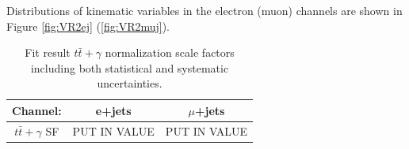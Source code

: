 Distributions of kinematic variables in the electron (muon) channels are shown in Figure \ref{fig:VR2ej} (\ref{fig:VR2muj}).
\begin{table}[h]
\begin{center}
{\renewcommand{\arraystretch}{1.2}
\begin{tabular}{c|c|c}
\hline
Channel:     &  e+jets   & $\mu$+jets  \\  \hline 
$t\bar{t}+\gamma$ SF    &  PUT IN VALUE   & PUT IN VALUE	\\ \hline %
\end{tabular}
\caption{Fit result $t\bar{t}+\gamma$ normalization scale factors including both statistical and systematic uncertainties.  }
\label{tab:VR2SFs}
}
\end{center}
\end{table}

